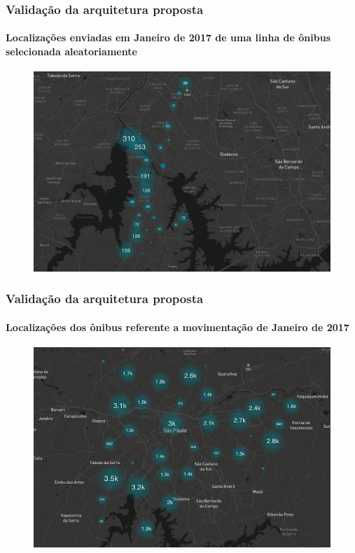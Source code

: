 \documentclass{beamer}
\begin{document}
\begin{frame}
\frametitle{Validação da arquitetura proposta}
\framesubtitle{Localizações enviadas em Janeiro de 2017 de uma linha de ônibus selecionada aleatoriamente}
\begin{figure}[!htb]%
	\centering
		\includegraphics[width=0.85\linewidth]{only_one_bus_map.png}
	\label{fig:analysis_by_bus_lines}
\end{figure}
\end{frame}
\begin{frame}
\frametitle{Validação da arquitetura proposta}
\framesubtitle{Localizações dos ônibus referente a movimentação de Janeiro de 2017}
\begin{figure}[!htb]%
	\centering
		\includegraphics[width=0.90\linewidth]{buses_map.png}
	\label{fig:pizza_bus}
\end{figure}
\end{frame}
\end{document}
